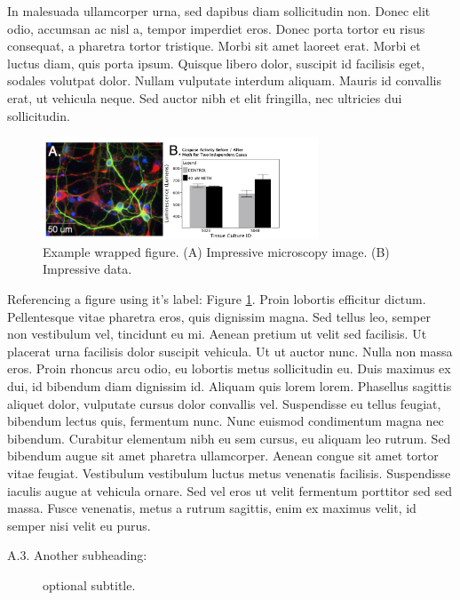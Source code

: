 \documentclass[11pt, notitlepage]{article} %
\begin{document}
In malesuada ullamcorper urna, sed dapibus diam sollicitudin non. Donec elit odio, accumsan ac nisl a, tempor imperdiet eros. Donec porta tortor eu risus consequat, a pharetra tortor tristique. Morbi sit amet laoreet erat. Morbi et luctus diam, quis porta ipsum. Quisque libero dolor, suscipit id facilisis eget, sodales volutpat dolor. Nullam vulputate interdum aliquam. Mauris id convallis erat, ut vehicula neque. Sed auctor nibh et elit fringilla, nec ultricies dui sollicitudin.

\begin{figure} %
	\includegraphics[width=8.2cm]{Figures/Fig1.jpg}
	\caption{\footnotesize Example wrapped figure. (A) Impressive microscopy image. (B) Impressive data.}
	\label{fig:example}
\end{figure}

Referencing a figure using it's label: Figure \ref{fig:example}. Proin lobortis efficitur dictum. Pellentesque vitae pharetra eros, quis dignissim magna. Sed tellus leo, semper non vestibulum vel, tincidunt eu mi. Aenean pretium ut velit sed facilisis. Ut placerat urna facilisis dolor suscipit vehicula. Ut ut auctor nunc. Nulla non massa eros. Proin rhoncus arcu odio, eu lobortis metus sollicitudin eu. Duis maximus ex dui, id bibendum diam dignissim id. Aliquam quis lorem lorem. Phasellus sagittis aliquet dolor, vulputate cursus dolor convallis vel. Suspendisse eu tellus feugiat, bibendum lectus quis, fermentum nunc. Nunc euismod condimentum magna nec bibendum. Curabitur elementum nibh eu sem cursus, eu aliquam leo rutrum. Sed bibendum augue sit amet pharetra ullamcorper. Aenean congue sit amet tortor vitae feugiat. Vestibulum vestibulum luctus metus venenatis facilisis. Suspendisse iaculis augue at vehicula ornare. Sed vel eros ut velit fermentum porttitor sed sed massa. Fusce venenatis, metus a rutrum sagittis, enim ex maximus velit, id semper nisi velit eu purus.

\begin{description}
	\item[A.3. Another subheading:]{optional subtitle.}
\end{description}
\end{document}
